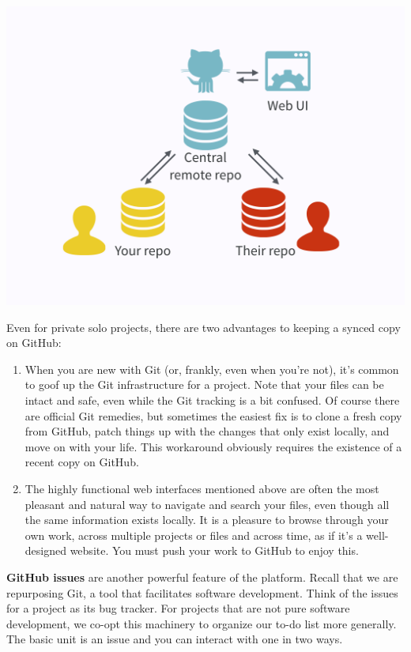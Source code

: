 \documentclass[12pt]{article}
\begin{document}
\includegraphics[width=1\linewidth]{your-repo-their-repo-central-remote-repo}

Even for private solo projects, there are two advantages to keeping a
synced copy on GitHub:

\begin{enumerate}
\def\labelenumi{\arabic{enumi}.}
\item
  When you are new with Git (or, frankly, even when you're not), it's
  common to goof up the Git infrastructure for a project. Note that your
  files can be intact and safe, even while the Git tracking is a bit
  confused. Of course there are official Git remedies, but sometimes the
  easiest fix is to clone a fresh copy from GitHub, patch things up with
  the changes that only exist locally, and move on with your life. This
  workaround obviously requires the existence of a recent copy on
  GitHub.
\item
  The highly functional web interfaces mentioned above are often the
  most pleasant and natural way to navigate and search your files, even
  though all the same information exists locally. It is a pleasure to
  browse through your own work, across multiple projects or files and
  across time, as if it's a well-designed website. You must push your
  work to GitHub to enjoy this.
\end{enumerate}

\textbf{GitHub issues} are another powerful feature of the platform.
Recall that we are repurposing Git, a tool that facilitates software
development. Think of the issues for a project as its bug tracker. For
projects that are not pure software development, we co-opt this
machinery to organize our to-do list more generally. The basic unit is
an issue and you can interact with one in two ways.
\end{document}
